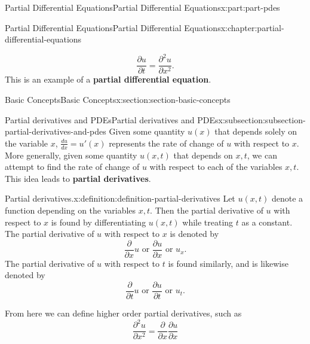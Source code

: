 \documentclass[twoside,10pt,]{book}
\newcommand{\terminology}[1]{\textbf{#1}}
\numberwithin{equation}{part}
\begin{document}
\begin{partptx}{Partial Differential Equations}{}{Partial Differential Equations}{}{}{x:part:part-pdes}
\begin{chapterptx}{Partial Differential Equations}{}{Partial Differential Equations}{}{}{x:chapter:partial-differential-equations}
\begin{introduction}{}
%
\begin{equation*}
\frac{\partial u}{\partial t} = \frac{\partial^{2}u}{\partial x^{2}}.
\end{equation*}
This is an example of a \terminology{partial differential equation}.%
\end{introduction}%
%
%
\typeout{************************************************}
\typeout{************************************************}
%
\begin{sectionptx}{Basic Concepts}{}{Basic Concepts}{}{}{x:section:section-basic-concepts}
%
%
\typeout{************************************************}
\typeout{************************************************}
%
\begin{subsectionptx}{Partial derivatives and PDEs}{}{Partial derivatives and PDEs}{}{}{x:subsection:subsection-partial-derivatives-and-pdes}
Given some quantity \(u(x)\) that depends solely on the variable \(x\), \(\frac{du}{dx} = u'(x)\) represents the rate of change of \(u\) with respect to \(x\). More generally, given some quantity \(u(x,t)\) that depends on \(x,t\), we can attempt to find the rate of change of \(u\) with respect to each of the variables \(x,t\). This idea leads to \terminology{partial derivatives}.%
\begin{definition}{Partial derivatives.}{x:definition:definition-partial-derivatives}%
%
Let \(u(x,t)\) denote a function depending on the variables \(x,t\). Then the partial derivative of \(u\) with respect to \(x\) is found by differentiating \(u(x,t)\) while treating \(t\) as a constant. The partial derivative of \(u\) with respect to \(x\) is denoted by%
\begin{equation*}
\frac{\partial}{\partial x}u\text{ or }\frac{\partial u}{\partial x}\text{ or }u_{x}.
\end{equation*}
The partial derivative of \(u\) with respect to \(t\) is found similarly, and is likewise denoted by%
\begin{equation*}
\frac{\partial}{\partial t}u\text{ or }\frac{\partial u}{\partial t}\text{ or }u_{t}.
\end{equation*}
%
\end{definition}
From here we can define higher order partial derivatives, such as%
\begin{equation*}
\frac{\partial^{2}u}{\partial x^{2}} = \frac{\partial}{\partial x}\frac{\partial u}{\partial x}
\end{equation*}

\end{subsectionptx}
\end{sectionptx}
\end{chapterptx}
\end{partptx}
\end{document}
